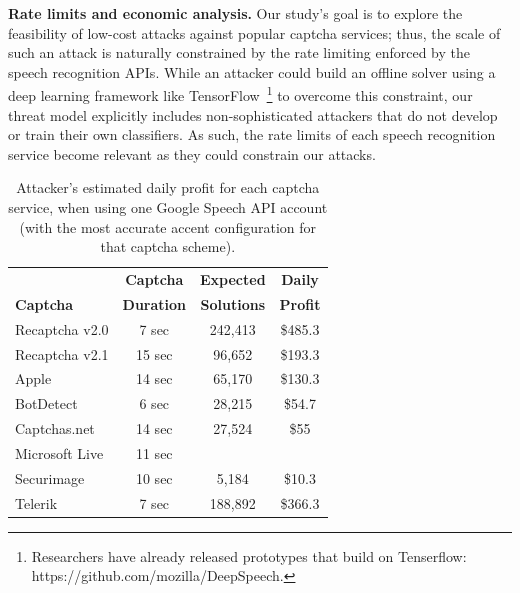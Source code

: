 
\textbf{Rate limits and economic analysis.} Our study's goal is to explore the feasibility of low-cost attacks 
against popular captcha services; thus, the scale of such an attack is naturally constrained by the rate
limiting enforced by the speech recognition APIs. While an attacker could build an offline solver
using a deep learning framework like TensorFlow~\cite{abadi2016tensorflow}\footnote{Researchers have already
released prototypes that build on Tenserflow: {https://github.com/mozilla/DeepSpeech}.} to overcome this constraint,
our threat model explicitly includes non-sophisticated attackers that do not develop or train their own 
classifiers. As such, the rate limits of each speech recognition service become relevant as they could
constrain our attacks.

\begin{table}[t]
\centering
\caption{Attacker's estimated daily profit for each captcha service, when using one Google Speech API account
(with the most accurate accent configuration for that captcha scheme).}
\begin{tabular}{lccc}
\toprule
& \textbf{Captcha} & \textbf{Expected} & \textbf{Daily} \\
\textbf{Captcha}&  \textbf{Duration} & \textbf{Solutions} & \textbf{Profit} \\
\hline
Recaptcha v2.0 & 7 sec & 242,413 & \$485.3 \\
\rowcolor{Gray}
Recaptcha v2.1 & 15 sec & 96,652 & \$193.3 \\
Apple  & 14 sec & 65,170 & \$130.3 \\
\rowcolor{Gray}
BotDetect  & 6 sec & 28,215 & \$54.7 \\
Captchas.net & 14 sec & 27,524 & \$55 \\
\rowcolor{Gray}
Microsoft Live & 11 sec &  & \\
Securimage & 10 sec & 5,184 & \$10.3 \\
\rowcolor{Gray}
Telerik & 7 sec & 188,892 & \$366.3 \\
\bottomrule
\end{tabular}
\label{tab:money}
\end{table}

